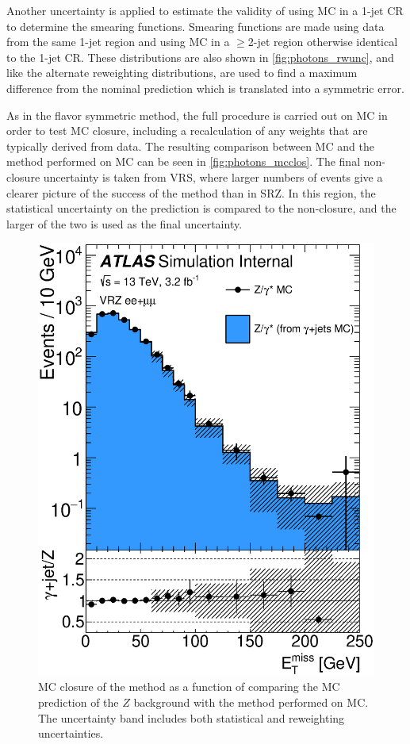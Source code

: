 Another uncertainty is applied to estimate the validity of using \ac{MC} in a 1-jet \ac{CR} to determine the smearing functions. Smearing functions are made using data from the same 1-jet region and using \ac{MC} in a $\geq$2-jet region otherwise identical to the 1-jet \ac{CR}. These distributions are also shown in \autoref{fig:photons_rwunc}, and like the alternate reweighting distributions, are used to find a maximum difference from the nominal prediction which is translated into a symmetric error. 

As in the flavor symmetric method, the full procedure is carried out on \ac{MC} in order to test \ac{MC} closure, including a recalculation of any weights that are typically derived from data. The resulting comparison between \dyjets \ac{MC} and the \gjets method performed on \ac{MC} can be seen in \autoref{fig:photons_mcclos}. The final non-closure uncertainty is taken from VRS, where larger numbers of events give a clearer picture of the success of the method than in SRZ. In this region, the statistical uncertainty on the prediction is compared to the non-closure, and the larger of the two is used as the final uncertainty. 

\begin{centering}
\begin{figure}[!hbt]
\myfloatalign
\includegraphics[width=.85\linewidth]{figures/photons/gamma_jet_closure_ee_mm.eps}
\caption{\ac{MC} closure of the \gjets method as a function of \met comparing the \ac{MC} prediction of the $Z$ background with the \gjets method performed on \gjets \ac{MC}. The uncertainty band includes both statistical and reweighting uncertainties.}
\label{fig:photons_mcclos}
\end{figure}
\end{centering}

